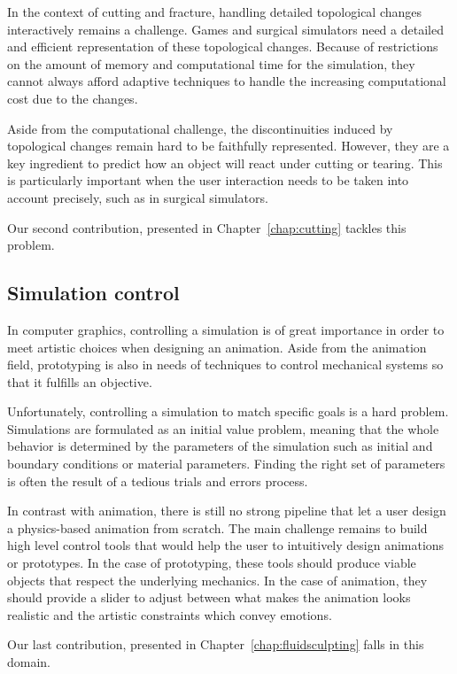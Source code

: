 In the context of cutting and fracture, handling detailed topological changes interactively remains a challenge. Games and surgical simulators need a detailed and efficient representation of these topological changes. Because of restrictions on the amount of memory and computational time for the simulation, they cannot always afford adaptive techniques to handle the increasing computational cost due to the changes.

Aside from the computational challenge, the discontinuities induced by topological changes remain hard to be faithfully represented. However, they are a key ingredient to predict how an object will react under cutting or tearing.
This is particularly important when the user interaction needs to be taken into account precisely, such as in surgical simulators.


Our second contribution, presented in Chapter~\ref{chap:cutting} tackles this problem.

\subsection{Simulation control}

In computer graphics, controlling a simulation is of great importance in order to meet artistic choices when designing an animation. Aside from the animation field, prototyping is also in needs of techniques to control mechanical systems so that it fulfills an objective.

Unfortunately, controlling a simulation to match specific goals is a hard problem. 
Simulations are formulated as an initial value problem, meaning that the whole behavior is determined by the parameters of the simulation such as initial and boundary conditions or material parameters. 
Finding the right set of parameters is often the result of a tedious trials and errors process.

In contrast with animation, there is still no strong pipeline that let a user design a physics-based animation from scratch. 
The main challenge remains to build high level control tools that would help the user to intuitively design animations or prototypes. 
In the case of prototyping, these tools should produce viable objects that respect the underlying mechanics. 
In the case of animation, they should provide a slider to adjust between what makes the animation looks realistic and the artistic constraints which convey emotions.


Our last contribution, presented in Chapter~\ref{chap:fluidsculpting} falls in this domain.

